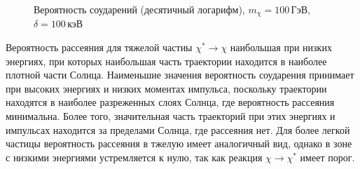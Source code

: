 \begin{figure}[!h]
\label{plot:C_LH_minus}
\caption{Вероятность соударений (десятичный логарифм), $m_{\chi} = 100 \, \text{ГэВ}$, $\delta = 100 \, \text{кэВ}$}
\end{figure}

Вероятность рассеяния для тяжелой частиы $\chi^* \rightarrow \chi$ наибольшая при низких энергиях, при которых наибольшая часть траектории находится в наиболее плотной части Солнца. Наименьшие значения вероятность соударения принимает при высоких энергиях и низких моментах импульса, поскольку траектории находятся в наиболее разреженных слоях Солнца, где вероятность рассеяния минимальна. Более того, значительная часть траекторий при этих энергиях и импульсах находится за пределами Солнца, где рассеяния нет.
Для более легкой частицы вероятность рассеяния в тжелую имеет аналогичный вид, однако в зоне с низкими энергиями устремляется к нулю, так как реакция $\chi \rightarrow \chi^*$ имеет порог.


